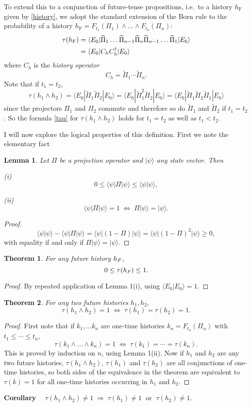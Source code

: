 \documentclass[12pt,a4paper,reqno]{article}
\newcommand{\linespace}{\vspace{\baselineskip}}
\newcommand{\upline}{\vspace{-1.2\abovedisplayskip}}
\renewcommand{\(}{\left(}
\renewcommand{\)}{\right)}
\newcommand{\rmF}{\text{\emph{F}}}
\newcommand{\<}{\langle}
\renewcommand{\>}{\rangle}
\newcommand{\impl}{\Longrightarrow}
\newcommand{\be}{\begin{equation}}
\newcommand{\ee}{\end{equation}}
\newcommand{\Pii}{\widetilde{\Pi}}
\theoremstyle{plain} %
\newtheorem{thm}{Theorem}
\newtheorem{lemma}{Lemma}
\begin{document}
To extend this to a conjunction of future-tense propositions, i.e.\ to a history $h_\text{F}$ given by \eqref{history}, we adopt the standard extension of the Born rule \cite{Griffiths:book,Wallace:multiverse} to the probability of a history $h_\text{F} = F_{t_1}(\Pi_1)\land \ldots \land F_{t_n}(\Pi_n)$:
\begin{align}\label{tau}
\tau(h_\text{F}) &= \<E_0|\Pii_1\ldots\Pii_{n-1}\Pii_n\Pii_{n-1}\ldots\Pii_1|E_0\>\\
&= \<E_0|C_h C_h^\dagger|E_0\>\notag
\end{align}
where $C_h$ is the \emph{history operator}
\be\label{historyop}
C_h = \Pii_1\cdots\Pii_n.
\ee
Note that if $t_1 = t_2$,
\[
\tau(h_1\land h_2) = \<E_0|\Pii_1\Pii_2|E_0\> = \<E_0|\Pii_1^2\Pii_2|E_0\> = \<E_0|\Pii_1\Pii_2\Pii_1|E_0\>
\]
since the projectors $\Pi_1$ and $\Pi_2$ commute and therefore so do $\Pii_1$ and $\Pii_2$ if $t_1 = t_2$. So the formula \eqref{tau} for $\tau(h_1\land h_2)$ holds for $t_1 = t_2$ as well as $t_1 < t_2$.

I will now explore the logical properties of this definition. First we note the elementary fact
\begin{lemma}
Let $\Pi$ be a projection operator and $|\psi\>$ any state vector. Then

\linespace \emph{(i)}\upline
\[
0 \le \<\psi|\Pi |\psi\> \le \<\psi|\psi\>,
\]

\emph{(ii)}\upline
\[ 
\<\psi|\Pi |\psi\> = 1 \; \iff \; \Pi|\psi\> = |\psi\>.
\]
\end{lemma}
\begin{proof}
\[
\<\psi|\psi\> - \<\psi|\Pi|\psi\> = \<\psi|(1 - \Pi)|\psi\> = \<\psi|(1-\Pi)^2|\psi\> \ge 0,
\]
with equality if and only if $\Pi|\psi\> = |\psi\>$.
\end{proof}

\begin{thm}
For any future history $h_\text{\rmF}$,
\[
0\le \tau(h_\text{\rmF}) \le 1.
\]
\end{thm}
\begin{proof}
By repeated application of Lemma 1(i), using $\<E_0|E_0\> = 1$. 
\end{proof}

\begin{thm} For any two future histories $h_1, h_2$,
\[
\tau(h_1\land h_2) = 1 \;\iff\; \tau(h_1) = \tau(h_2) = 1.
\]
\end{thm}
\begin{proof}
First note that if $k_1,\ldots k_n$ are one-time histories $k_n = F_{t_n}(\Pi_n)$ with $t_1\le \cdots \le t_n$,
\[
\tau(k_1\land \ldots \land k_n) = 1 \;\iff\; \tau(k_1) = \cdots = \tau(k_n).
\]
This is proved by induction on $n$, using Lemma 1(ii). Now if $h_1$ and $h_2$ are any two future histories, $\tau(h_1\land h_2)$, $\tau(h_1)$ and $\tau(h_2)$ are all conjunctions of one-time histories, so both sides of the equivalence in the theorem are equivalent to $\tau(k) = 1$ for all one-time histories occurring in $h_1$ and $h_2$.
\end{proof}
{\bf Corollary}
$\quad\tau(h_1\land h_2) \neq 1 \;\impl\; \tau(h_1)\neq 1\; \text{ or }\; \tau(h_2) \neq 1$.
\end{document}
